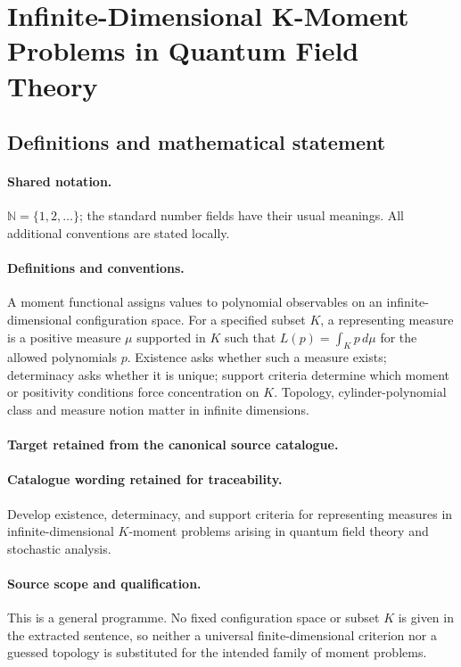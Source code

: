 \documentclass[11pt]{article}
\begin{document}
\section{Infinite-Dimensional K-Moment Problems in Quantum Field Theory}\label{statement}

\subsection{Definitions and mathematical statement}

\paragraph{Shared notation.}$\mathbb N=\{1,2,\ldots\}$; the standard number fields have their usual meanings. All additional conventions are stated locally.


\paragraph{Definitions and conventions.}
A moment functional assigns values to polynomial observables on an infinite-dimensional configuration space. For a specified subset $K$, a representing measure is a positive measure $\mu$ supported in $K$ such that $L(p)=\int_K p\,d\mu$ for the allowed polynomials $p$. Existence asks whether such a measure exists; determinacy asks whether it is unique; support criteria determine which moment or positivity conditions force concentration on $K$. Topology, cylinder-polynomial class and measure notion matter in infinite dimensions.

\paragraph{Target retained from the canonical source catalogue.}
\paragraph{Catalogue wording retained for traceability.}
Develop existence, determinacy, and support criteria for representing measures in infinite-dimensional $K$-moment problems arising in quantum field theory and stochastic analysis.

\paragraph{Source scope and qualification.}
This is a general programme. No fixed configuration space or subset $K$ is given in the extracted sentence, so neither a universal finite-dimensional criterion nor a guessed topology is substituted for the intended family of moment problems.
\end{document}
